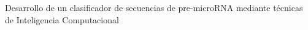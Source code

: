Desarrollo de un clasificador de secuencias de pre-microRNA mediante técnicas de Inteligencia Computacional
